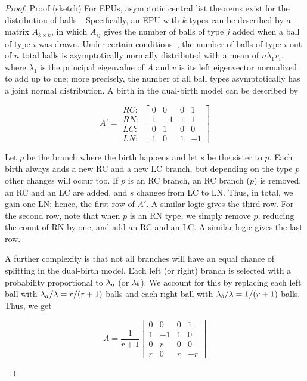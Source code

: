 \begin{proof}{Proof (sketch)}
For \glspl{EPU}, asymptotic central list theorems exist for the distribution of balls~\cite{Smythe1996}. Specifically, an \gls{EPU} with $k$ types can be described by a matrix $A_{k\times k}$, in which $A_{ij}$ gives the number of balls of type $j$ added when a ball of type $i$ was drawn. Under certain conditions~\cite{Smythe1996}, the number of balls of type $i$ out of $n$ total balls is asymptotically normally distributed with a mean of $n\lambda_1 v_i$, where $\lambda_1$ is the principal eigenvalue of $A$ and $v$ is its left eigenvector normalized to add up to one; more precisely, the number of all ball types asymptotically has a joint normal distribution. A birth in the dual-birth model can be described by
\begin{small}
$$
A'= 
\begin{matrix} 
RC: \\
RN: \\
LC: \\
LN:
\end{matrix}
\begin{bmatrix} 
0& 0&  0& 1 \\
1& -1&  1& 1 \\
0& 1&  0& 0 \\
1& 0&  1& -1 
\end{bmatrix}
$$ 
\end{small}

Let $p$ be the branch where the birth happens and let $s$ be the sister to $p$. Each birth always adds a new RC and a new LC branch, but depending on the type $p$
other changes will occur too. If $p$ is an RC branch, an RC branch ($p$) is removed, an RC and an LC are added, and $s$ changes from LC to LN. Thus, in total, we gain one LN; hence, the first row of $A'$. A similar logic gives the third row. For the second row, note that when $p$ is an RN type, we simply remove $p$, reducing the count of RN by one, and add an RC and an LC. A similar logic gives the last row. 

A further complexity is that not all branches will have an equal chance of splitting in the dual-birth model. Each left (or right) branch is selected with a probability proportional to $\lambda_a$ (or $\lambda_b$). We account for this by replacing each left ball with $\lambda_a/\lambda=r/(r+1)$ balls and each right ball with $\lambda_b/\lambda=1/(r+1)$ balls. Thus, we get

\begin{small}
$$
A= \frac{1}{r+1}
\begin{bmatrix} 
0& 0&  0& 1 \\
1& -1&  1& 0 \\
0& r&  0& 0 \\
r& 0&  r& -r 
\end{bmatrix}
$$ 
\end{small}


\end{proof}
